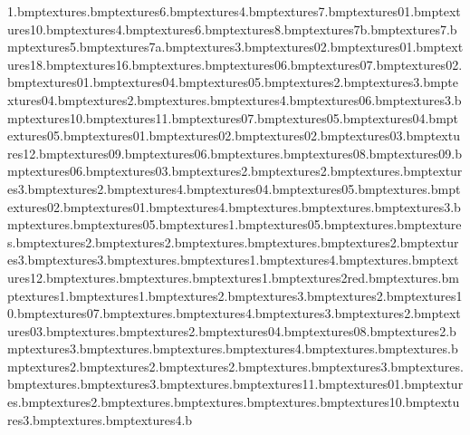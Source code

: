 1.bmp textures\treeend.bmp textures\browtree6.bmp textures\browtree4.bmp textures\browtree7.bmp textures\leaf01.bmp textures\animalcrate10.bmp textures\safarifruitree4.bmp textures\safarifruitree6.bmp textures\safarifruitree8.bmp textures\safarifruitree7b.bmp textures\safarifruitree7.bmp textures\safarifruitree5.bmp textures\safarifruitree7a.bmp textures\safarifruitree3.bmp textures\wanted02.bmp textures\sign01.bmp textures\sign18.bmp textures\sign16.bmp textures\oil.bmp textures\safarihoney06.bmp textures\safarihoney07.bmp textures\safarihoney02.bmp textures\safarihoney01.bmp textures\safarihoney04.bmp textures\safarihoney05.bmp textures\grassedge2.bmp textures\grassedge3.bmp textures\hubflowers04.bmp textures\electricfencesmash2.bmp textures\grassjoiner.bmp textures\electricfencesmash4.bmp textures\hubflowers06.bmp textures\electricfencesmash3.bmp textures\safrock10.bmp textures\safrock11.bmp textures\safrock07.bmp textures\safrock05.bmp textures\safrock04.bmp textures\safrockcream05.bmp textures\safrock01.bmp textures\safrock02.bmp textures\safrockcream02.bmp textures\safrockcream03.bmp textures\safrockcream12.bmp textures\safrockcream09.bmp textures\safrockcream06.bmp textures\safwall.bmp textures\safrock08.bmp textures\safrock09.bmp textures\safrock06.bmp textures\safrock03.bmp textures\safwall2.bmp textures\safwarmwood2.bmp textures\safwarmwood.bmp textures\safwarmwood3.bmp textures\trunkoran2.bmp textures\treeroots4.bmp textures\grasstocobble04.bmp textures\hubflowers05.bmp textures\footprintgreen.bmp textures\hubflowers02.bmp textures\hubflowers01.bmp textures\grassedge4.bmp textures\footprintorangeron.bmp textures\footprintorange.bmp textures\grassjoiner3.bmp textures\arrows.bmp textures\grasstocobble05.bmp textures\track1.bmp textures\hubpath05.bmp textures\trackcorner.bmp textures\tracks.bmp textures\track2.bmp textures\tracksfade2.bmp textures\tracksfade.bmp textures\storagepath.bmp textures\storagepath2.bmp textures\storagepath3.bmp textures\grassshad3.bmp textures\leavescorn.bmp textures\leaves1.bmp textures\leaves4.bmp textures\grassshad.bmp textures\safrock12.bmp textures\pathrock.bmp textures\pathrockcor.bmp textures\trunkred1.bmp textures\trunkend2red.bmp textures\leavescoryellow.bmp textures\leavesyellow1.bmp textures\leafpath1.bmp textures\leafpath2.bmp textures\leafpath3.bmp textures\leavesyellow2.bmp textures\safrockcream10.bmp textures\safrockcream07.bmp textures\trunkendred.bmp textures\trunkred4.bmp textures\trunkred3.bmp textures\trunkred2.bmp textures\grasstocobble03.bmp textures\footprintyellow.bmp textures\grassjoiner2.bmp textures\safrockcream04.bmp textures\safrockcream08.bmp textures\grasswedgeblue2.bmp textures\grassblue3.bmp textures\grasswbluetuft.bmp textures\grassjoinerelephant.bmp textures\grassjoiner4.bmp textures\cagewall.bmp textures\footprintblue.bmp textures\leavespurp2.bmp textures\treeroots2.bmp textures\leavecorpurp2.bmp textures\leavespurp.bmp textures\treeroots3.bmp textures\vanskidmarks.bmp textures\leavecorpurp.bmp textures\leavespurp3.bmp textures\treeroots.bmp textures\safrockcream11.bmp textures\safrockcream01.bmp textures\footprintpurp.bmp textures\bunkerpiller2.bmp textures\bunkerwall.bmp textures\bunkerbricks.bmp textures\bunkerlight.bmp textures\safarihoney10.bmp textures\wbridge3.bmp textures\rope.bmp textures\trunk4.b